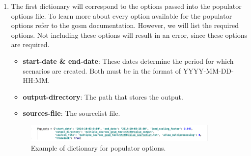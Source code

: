 \documentclass{article}
\begin{document}
\begin{enumerate}
\item The first dictionary will correspond to the options passed into the populator options file. To learn more about every option available for the populator options refer to the gosm documentation. However, we will list the required options. Not including these options will result in an error, since these options are required.
\begin{itemize}
	\item \textbf{start-date \& end-date}: These dates determine the period for which scenarios are created. Both must be in the format of YYYY-MM-DD-HH:MM.
	\item \textbf{output-directory}: The path that stores the output.
	\item \textbf{sources-file}: The sourcelist file.
\end{itemize}
\begin{figure}[H]
	\centering
	\includegraphics[width=0.9\textwidth]{populator_opts.png}
	\caption{Example of dictionary for populator options.}
\end{figure}

\vspace{10mm}


\end{enumerate}
\end{document}
